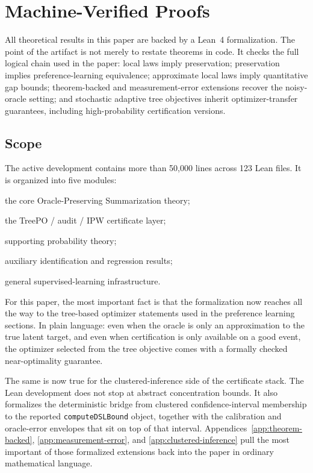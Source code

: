 \section{Machine-Verified Proofs}\label{sec:verification}

All theoretical results in this paper are backed by a Lean~4 formalization.
The point of the artifact is not merely to restate theorems in code. It checks
the full logical chain used in the paper: local laws imply preservation;
preservation implies preference-learning equivalence; approximate local laws
imply quantitative gap bounds; theorem-backed and measurement-error extensions
recover the noisy-oracle setting; and stochastic adaptive tree objectives
inherit optimizer-transfer guarantees, including high-probability certification
versions.

\subsection{Scope}

The active development contains more than 50{,}000 lines across 123 Lean files.
It is organized into five modules:
\begin{description}[nosep]
    \item[OPT] the core Oracle-Preserving Summarization theory;
    \item[DSL] the TreePO / audit / IPW certificate layer;
    \item[CLT] supporting probability theory;
    \item[Econometrics] auxiliary identification and regression results;
    \item[ML] general supervised-learning infrastructure.
\end{description}

For this paper, the most important fact is that the formalization now reaches
all the way to the tree-based optimizer statements used in the preference
learning sections. In plain language: even when the oracle is only an
approximation to the true latent target, and even when certification is only
available on a good event, the optimizer selected from the tree objective comes
with a formally checked near-optimality guarantee.

The same is now true for the clustered-inference side of the certificate stack.
The Lean development does not stop at abstract concentration bounds. It also
formalizes the deterministic bridge from clustered confidence-interval
membership to the reported \texttt{computeDSLBound} object, together with the
calibration and oracle-error envelopes that sit on top of that interval.
Appendices~\ref{app:theorem-backed}, \ref{app:measurement-error}, and
\ref{app:clustered-inference} pull the most important of those formalized
extensions back into the paper in ordinary mathematical language.

